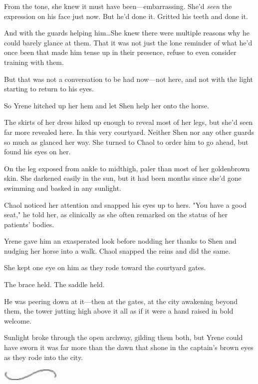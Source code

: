 From the tone, she knew it must have been---embarrassing.
She'd \emph{seen} the expression on his face just now.
But he'd done it.
Gritted his teeth and done it.

And with the guards helping him\ldots She knew there were multiple reasons why he could barely glance at them.
That it was not just the lone reminder of what he'd once been that made him tense up in their presence, refuse to even consider training with them.

But that was not a conversation to be had now---not here, and not with the light starting to return to his eyes.

So Yrene hitched up her hem and let Shen help her onto the horse.

The skirts of her dress hiked up enough to reveal most of her legs, but she'd seen far more revealed here.
In this very courtyard.
Neither Shen nor any other guards so much as glanced her way.
She turned to Chaol to order him to go ahead, but found his eyes on her.

On the leg exposed from ankle to midthigh, paler than most of her goldenbrown skin.
She darkened easily in the sun, but it had been months since she'd gone swimming and basked in any sunlight.

Chaol noticed her attention and snapped his eyes up to hers.
"You have a good seat," he told her, as clinically as she often remarked on the status of her patients' bodies.

Yrene gave him an exasperated look before nodding her thanks to Shen and nudging her horse into a walk.
Chaol snapped the reins and did the same.

She kept one eye on him as they rode toward the courtyard gates.

The brace held.
The saddle held.

He was peering down at it---then at the gates, at the city awakening beyond them, the tower jutting high above it all as if it were a hand raised in bold welcome.

Sunlight broke through the open archway, gilding them both, but Yrene could have sworn it was far more than the dawn that shone in the captain's brown eyes as they rode into the city.

\begin{center}
	\includegraphics[width=1.12in,height=0.24in]{images/seperator}
\end{center}

